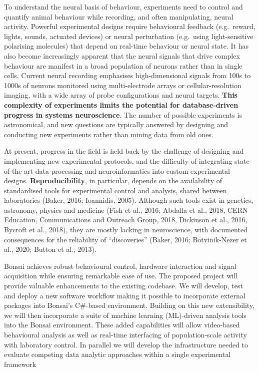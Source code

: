 To understand the neural basis of behaviour, experiments need to control and quantify animal behaviour while recording, and often manipulating, neural activity. 
%
Powerful experimental designs require behavioural feedback (e.g.\ reward, lights, sounds, actuated
devices) or neural perturbation (e.g.\ using light-sensitive polarising
molecules) that depend on real-time behaviour or neural state.
%
It has also become increasingly apparent that the neural signals that
drive complex behaviour are manifest in a broad population of neurons rather
than in single cells. Current neural recording emphasises high-dimensional
signals from 100s to 1000s of neurons monitored using multi-electrode arrays or cellular-resolution imaging, with a wide array of probe configurations and neural targets.
%
\textbf{This complexity of experiments limits the potential for database-driven progress in systems neuroscience}. The number of possible experiments is astronomical, and new questions are typically answered by designing and conducting new experiments rather than mining data from old ones.

At present, progress in the field is held back by the challenge of designing and implementing new experimental protocols, and the difficulty of integrating state-of-the-art data processing and neuroinformatics into custom experimental designs.
%
\textbf{Reproducibility}, in particular, depends on the availability of standardised tools for experimental control and analysis, shared between laboratories (Baker, 2016; Ioannidis, 2005). Although such tools exist in genetics, astronomy, physics and medicine (Fish et al., 2016; Abdalla et al., 2018, CERN Education, Communications and Outreach Group, 2018, Dickinson et al., 2016, Bycroft et al., 2018), they are mostly lacking in neuroscience, with documented consequences for the reliability of ``discoveries'' (Baker, 2016; Botvinik-Nezer et al., 2020; Button et al., 2013). 




Bonsai achieves robust behavioural control, hardware interaction and signal acquisition while ensuring remarkable ease of use.  The proposed project will provide valuable enhancements to the existing codebase.  We will develop, test and deploy a new software workflow making it possible to incorporate external packages into Bonsai's C\#-based environment.  Building on this new extensibility, we will then incorporate a suite of machine learning (ML)-driven analysis tools into the Bonsai environment.  These added capabilities will allow  video-based behavioural analysis as well as real-time interfacing of population-scale activity with laboratory control.  In parallel we will develop the infrastructure needed to evaluate competing data analytic approaches within a single experimental framework


